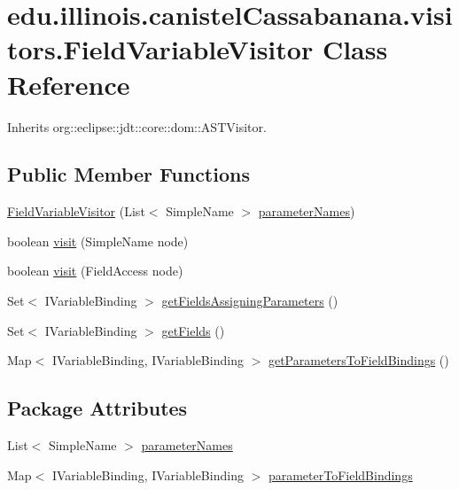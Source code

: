 \hypertarget{classedu_1_1illinois_1_1canistelCassabanana_1_1visitors_1_1FieldVariableVisitor}{
\section{edu.illinois.canistelCassabanana.visitors.FieldVariableVisitor Class Reference}
\label{classedu_1_1illinois_1_1canistelCassabanana_1_1visitors_1_1FieldVariableVisitor}
}


Inherits org::eclipse::jdt::core::dom::ASTVisitor.

\subsection*{Public Member Functions}
\begin{DoxyCompactItemize}
\item 
\hyperlink{classedu_1_1illinois_1_1canistelCassabanana_1_1visitors_1_1FieldVariableVisitor_aa11e1eafcdb58ba4c2779654d163a565}{FieldVariableVisitor} (List$<$ SimpleName $>$ \hyperlink{classedu_1_1illinois_1_1canistelCassabanana_1_1visitors_1_1FieldVariableVisitor_a76b871cecb125d753d2940effd0012fc}{parameterNames})
\item 
boolean \hyperlink{classedu_1_1illinois_1_1canistelCassabanana_1_1visitors_1_1FieldVariableVisitor_a027f6af8c69c787b9069f291fd8ea62b}{visit} (SimpleName node)
\item 
boolean \hyperlink{classedu_1_1illinois_1_1canistelCassabanana_1_1visitors_1_1FieldVariableVisitor_af17226c90eeacf0938ae35478d8c0723}{visit} (FieldAccess node)
\item 
Set$<$ IVariableBinding $>$ \hyperlink{classedu_1_1illinois_1_1canistelCassabanana_1_1visitors_1_1FieldVariableVisitor_a7a19e2f36c6a4f08ecca64cb97659818}{getFieldsAssigningParameters} ()
\item 
Set$<$ IVariableBinding $>$ \hyperlink{classedu_1_1illinois_1_1canistelCassabanana_1_1visitors_1_1FieldVariableVisitor_a3e516c7f4c19ade2a76e27986faa2922}{getFields} ()
\item 
Map$<$ IVariableBinding, IVariableBinding $>$ \hyperlink{classedu_1_1illinois_1_1canistelCassabanana_1_1visitors_1_1FieldVariableVisitor_a169b93fec7786876935e3eda80f63347}{getParametersToFieldBindings} ()
\end{DoxyCompactItemize}
\subsection*{Package Attributes}
\begin{DoxyCompactItemize}
\item 
List$<$ SimpleName $>$ \hyperlink{classedu_1_1illinois_1_1canistelCassabanana_1_1visitors_1_1FieldVariableVisitor_a76b871cecb125d753d2940effd0012fc}{parameterNames}
\item 
Map$<$ IVariableBinding, IVariableBinding $>$ \hyperlink{classedu_1_1illinois_1_1canistelCassabanana_1_1visitors_1_1FieldVariableVisitor_aea653ab0a4a19d426ffe1a11474fe331}{parameterToFieldBindings}
\end{DoxyCompactItemize}
